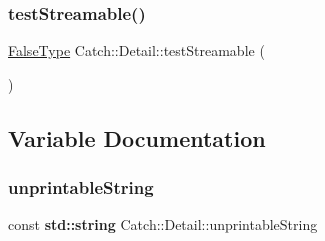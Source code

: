\mbox{\label{namespace_catch_1_1_detail_aac81f01b0d687f75b8f24a925591b7ac}} 
\subsubsection{\texorpdfstring{test\+Streamable()}{testStreamable()}\hspace{0.1cm}{\footnotesize\ttfamily [2/2]}}
{\footnotesize\ttfamily \hyperlink{struct_catch_1_1_detail_1_1_false_type}{False\+Type} Catch\+::\+Detail\+::test\+Streamable (\begin{DoxyParamCaption}\item[{\hyperlink{struct_catch_1_1_detail_1_1_false_type}{False\+Type}}]{ }\end{DoxyParamCaption})}



\subsection{Variable Documentation}
\mbox{\label{namespace_catch_1_1_detail_a466775f4eec29ffef29ab334cd885136}} 
\subsubsection{\texorpdfstring{unprintable\+String}{unprintableString}}
{\footnotesize\ttfamily const \textbf{ std\+::string} Catch\+::\+Detail\+::unprintable\+String}


